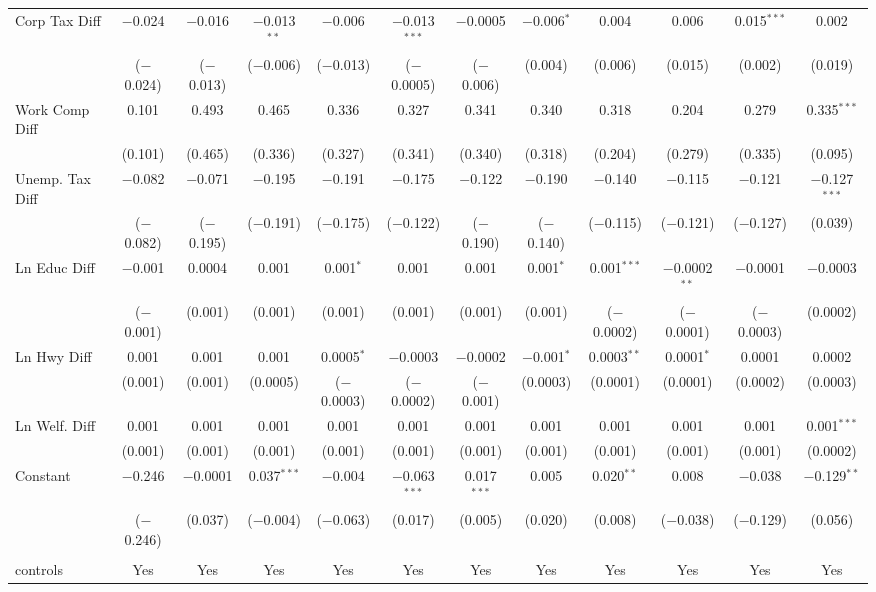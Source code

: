 \begin{table}[!htbp]
\begin{tabular}{@{\extracolsep{5pt}}lccccccccccc}
  Corp Tax Diff & $-$0.024 & $-$0.016 & $-$0.013$^{**}$ & $-$0.006 & $-$0.013$^{***}$ & $-$0.0005 & $-$0.006$^{*}$ & 0.004 & 0.006 & 0.015$^{***}$ & 0.002 \\ 
  & ($-$0.024) & ($-$0.013) & ($-$0.006) & ($-$0.013) & ($-$0.0005) & ($-$0.006) & (0.004) & (0.006) & (0.015) & (0.002) & (0.019) \\ 
  Work Comp Diff & 0.101 & 0.493 & 0.465 & 0.336 & 0.327 & 0.341 & 0.340 & 0.318 & 0.204 & 0.279 & 0.335$^{***}$ \\ 
  & (0.101) & (0.465) & (0.336) & (0.327) & (0.341) & (0.340) & (0.318) & (0.204) & (0.279) & (0.335) & (0.095) \\ 
  Unemp. Tax Diff & $-$0.082 & $-$0.071 & $-$0.195 & $-$0.191 & $-$0.175 & $-$0.122 & $-$0.190 & $-$0.140 & $-$0.115 & $-$0.121 & $-$0.127$^{***}$ \\ 
  & ($-$0.082) & ($-$0.195) & ($-$0.191) & ($-$0.175) & ($-$0.122) & ($-$0.190) & ($-$0.140) & ($-$0.115) & ($-$0.121) & ($-$0.127) & (0.039) \\ 
  Ln Educ Diff & $-$0.001 & 0.0004 & 0.001 & 0.001$^{*}$ & 0.001 & 0.001 & 0.001$^{*}$ & 0.001$^{***}$ & $-$0.0002$^{**}$ & $-$0.0001 & $-$0.0003 \\ 
  & ($-$0.001) & (0.001) & (0.001) & (0.001) & (0.001) & (0.001) & (0.001) & ($-$0.0002) & ($-$0.0001) & ($-$0.0003) & (0.0002) \\ 
  Ln Hwy Diff & 0.001 & 0.001 & 0.001 & 0.0005$^{*}$ & $-$0.0003 & $-$0.0002 & $-$0.001$^{*}$ & 0.0003$^{**}$ & 0.0001$^{*}$ & 0.0001 & 0.0002 \\ 
  & (0.001) & (0.001) & (0.0005) & ($-$0.0003) & ($-$0.0002) & ($-$0.001) & (0.0003) & (0.0001) & (0.0001) & (0.0002) & (0.0003) \\ 
  Ln Welf. Diff & 0.001 & 0.001 & 0.001 & 0.001 & 0.001 & 0.001 & 0.001 & 0.001 & 0.001 & 0.001 & 0.001$^{***}$ \\ 
  & (0.001) & (0.001) & (0.001) & (0.001) & (0.001) & (0.001) & (0.001) & (0.001) & (0.001) & (0.001) & (0.0002) \\ 
  Constant & $-$0.246 & $-$0.0001 & 0.037$^{***}$ & $-$0.004 & $-$0.063$^{***}$ & 0.017$^{***}$ & 0.005 & 0.020$^{**}$ & 0.008 & $-$0.038 & $-$0.129$^{**}$ \\ 
  & ($-$0.246) & (0.037) & ($-$0.004) & ($-$0.063) & (0.017) & (0.005) & (0.020) & (0.008) & ($-$0.038) & ($-$0.129) & (0.056) \\ 
 \hline \\[-1.8ex] 
controls & Yes & Yes & Yes & Yes & Yes & Yes & Yes & Yes & Yes & Yes & Yes \\ 

\end{tabular}
\end{table}
